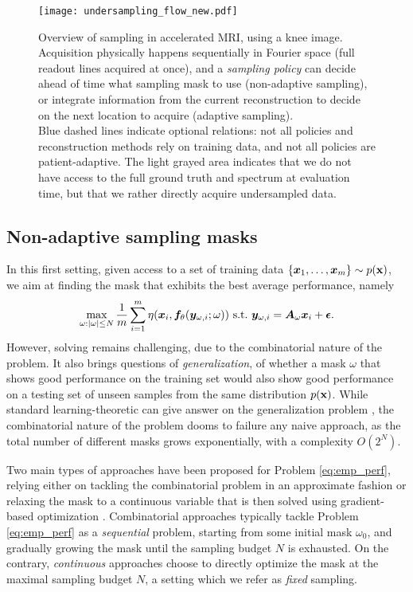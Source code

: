  \begin{figure}[!t]
    \centering
      \texttt{[image: undersampling\_flow\_new.pdf]}%
      \caption{Overview of sampling in accelerated MRI, using a knee image. Acquisition physically happens sequentially in Fourier space (full readout lines acquired at once), and a \textit{sampling policy} can decide ahead of time what sampling mask to use (non-adaptive sampling), or integrate information from the current reconstruction to decide on the next location to acquire (adaptive sampling).\\
      Blue dashed lines indicate optional relations: not all policies and reconstruction methods rely on training data, and not all policies are patient-adaptive. The light grayed area indicates that we do not have access to the full ground truth and spectrum at evaluation time, but that we rather directly acquire undersampled data.}
    \label{fig:acc_model}
\end{figure}

\subsection{Non-adaptive sampling masks}\label{sec:non-adapt}
In this first setting, given access to a set of training data $\{{\bm{x}}_1, \ldots, {\bm{x}}_m\} \sim p({\mathbf{x}})$, we aim at finding the mask that exhibits the best average performance, namely
\begin{equation}
    \max_{\omega: |\omega| \leq N} \frac{1}{m} \sum_{i=1}^m \eta({\bm{x}}_i, {\bm{f}}_\theta({\bm{y}}_{\omega,i}; \omega)) \text{~s.t.~}{\bm{y}}_{\omega,i} = {\bm{A}}_\omega{\bm{x}}_i + \boldsymbol{\epsilon}.\label{eq:emp_perf}
\end{equation}
However, solving  remains challenging, due to the combinatorial nature of the problem. It also brings questions of \textit{generalization}, of whether a mask $\omega$ that shows good performance on the training set would also show good performance on a testing set of unseen samples from the same distribution $p({\mathbf{x}})$. While standard learning-theoretic can give answer on the generalization problem \citep{gozcu2018learning}, the combinatorial nature of the problem dooms to failure any naive approach, as the total number of different masks grows exponentially, with a complexity $O(2^N)$. 

Two main types of approaches have been proposed for Problem \ref{eq:emp_perf}, relying either on tackling the combinatorial problem in an approximate fashion \citep{gozcu2018learning,zibetti2020fast} or relaxing the mask to a continuous variable that is then solved using gradient-based optimization \citep{bahadir2019learning,aggarwal2020j,weiss2020joint,huijben2020learning,sherry2019learning}. Combinatorial approaches typically tackle Problem \ref{eq:emp_perf} as a \textit{sequential} problem, starting from some initial mask $\omega_0$, and gradually growing the mask until the sampling budget $N$ is exhausted. On the contrary, \textit{continuous} approaches choose to directly optimize the mask at the maximal sampling budget $N$, a setting which we refer as \textit{fixed} sampling.

